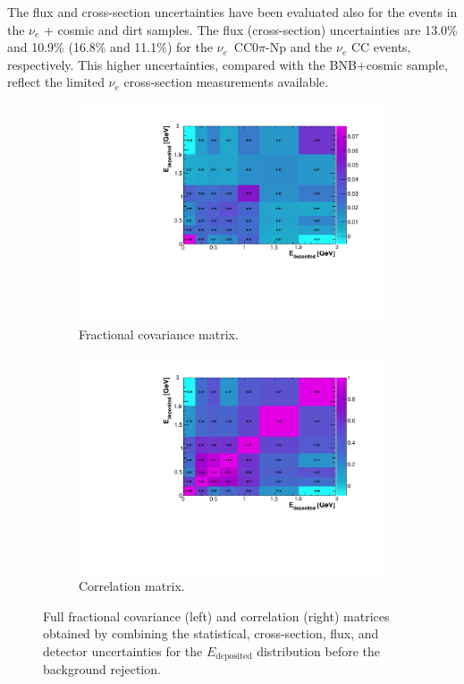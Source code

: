 The flux and cross-section uncertainties have been evaluated also for the events in the $\nu_e$ + cosmic and dirt samples. The flux (cross-section) uncertainties are 13.0\% and 10.9\% (16.8\% and 11.1\%) for the $\nu_e$~CC0$\pi$-Np and the $\nu_e$ CC events, respectively. This higher uncertainties, compared with the BNB+cosmic sample, reflect the limited $\nu_e$ cross-section measurements available. 

\begin{figure}[htbp]
\centering
    \begin{subfigure}{0.49\textwidth}
      \includegraphics[width=\linewidth]{figures/h_frac_tot.pdf}
      \caption{Fractional covariance matrix.}  \label{fig:frac_tot}
    \end{subfigure}\hfill
    \begin{subfigure}{0.49\textwidth}
      \includegraphics[width=\linewidth]{figures/h_corr_tot.pdf}
      \caption{Correlation matrix.} \label{fig:corr_tot}
    \end{subfigure}
    \caption{Full fractional covariance (left) and correlation (right) matrices obtained by combining the statistical, cross-section, flux, and detector uncertainties for the $E_{\mathrm{deposited}}$ distribution before the background rejection.} \label{fig:sys_tot}
\end{figure}

